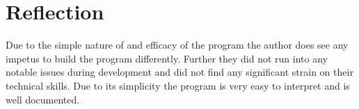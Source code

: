 \documentclass[11pt]{article}
\begin{document}
\section{Reflection}
Due to the simple nature of and efficacy of the program the author does see any impetus to build the program differently. Further they did not run into any notable issues during development and did not find any significant strain on their technical skills. Due to its simplicity the program is very easy to interpret and is well documented.


\end{document}
